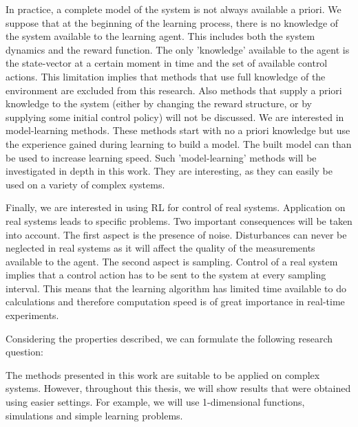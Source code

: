 In practice, a complete model of the system is not always available a priori. We suppose that at the beginning of the learning process, there is no knowledge of the system available to the learning agent. This includes both the system dynamics and the reward function. The only 'knowledge' available to the agent is the state-vector at a certain moment in time and the set of available control actions. This limitation implies that methods that use full knowledge of the environment are excluded from this research. Also methods that supply a priori knowledge to the system (either by changing the reward structure, or by supplying some initial control policy) will not be discussed. We are interested in model-learning methods. These methods start with no a priori knowledge but use the experience gained during learning to build a model. The built model can than be used to increase learning speed. Such 'model-learning' methods will be investigated in depth in this work. They are interesting, as they can easily be used on a variety of complex systems. 

Finally, we are interested in using \ac{RL} for control of real systems. Application on real systems leads to specific problems. Two important consequences will be taken into account. The first aspect is the presence of noise. Disturbances can never be neglected in real systems as it will affect the quality of the measurements available to the agent. The second aspect is sampling. Control of a real system implies that a control action has to be sent to the system at every sampling interval. This means that the learning algorithm has limited time available to do calculations and therefore computation speed is of great importance in real-time experiments.

Considering the properties described, we can formulate the following research question:
\begin{center}
\end{center}

The methods presented in this work are suitable to be applied on complex systems. However, throughout this thesis, we will show results that were obtained using easier settings. For example, we will use 1-dimensional functions, simulations and simple learning problems.

